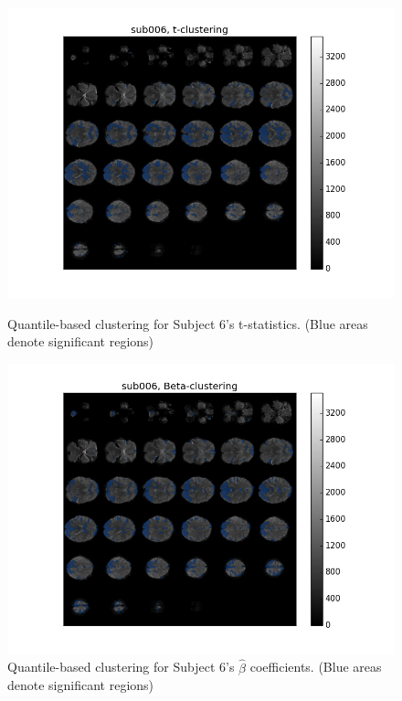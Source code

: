 \begin{figure}[ht]
\centering
\begin{minipage}[b]{0.45\linewidth}
	\centering
	\includegraphics[width=.8\linewidth]{../images/sub006_t_overlay.png} 
	\caption{Quantile-based clustering for Subject 6's t-statistics. 
	(Blue areas denote significant regions)}
	\label{fig:clustert}
\end{minipage}	

\begin{minipage}[b]{0.45\linewidth}
	\centering
		\includegraphics[width=.8\linewidth]{../images/sub006_beta_overlay.png} 
	\caption{Quantile-based clustering for Subject 6's $\hat{\beta}$ coefficients. 
	(Blue areas denote significant regions)}
	\label{fig:clusterbeta}
\end{minipage}


\end{figure}
